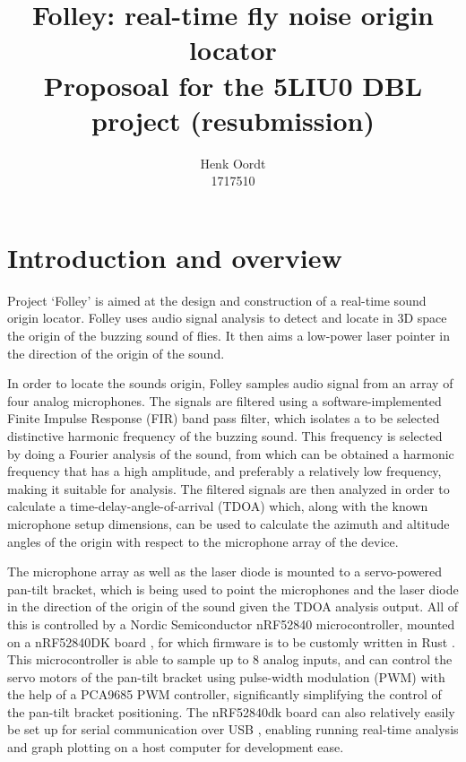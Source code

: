 \documentclass[a4paper]{article}
\begin{document}
\title{{Folley: real-time fly noise origin locator} \\\large {Proposoal for the 5LIU0 DBL project (resubmission)}}
\author{{Henk Oordt} \hfill
\\
{1717510} \hfill}

\maketitle

\section{Introduction and overview}
Project `Folley' is aimed at the design and construction of a real-time sound origin locator. Folley uses audio signal analysis to detect and locate in 3D space the origin of the buzzing sound of flies. It then aims a low-power laser pointer in the direction of the origin of the sound.

In order to locate the sounds origin, Folley samples audio signal from an array of four analog microphones. The signals are filtered using a software-implemented Finite Impulse Response (FIR) band pass filter, which isolates a to be selected distinctive harmonic frequency of the buzzing sound. This frequency is selected by doing a Fourier analysis \cite{fourier_analysis} of the sound, from which can be obtained a harmonic frequency that has a high amplitude, and preferably a relatively low frequency, making it suitable for analysis. The filtered signals are then analyzed in order to calculate a time-delay-angle-of-arrival (TDOA) \cite{6327613} which, along with the known microphone setup dimensions, can be used to calculate the azimuth and altitude angles of the origin with respect to the microphone array of the device.

The microphone array as well as the laser diode is mounted to a servo-powered pan-tilt bracket, which is being used to point the microphones and the laser diode in the direction of the origin of the sound given the TDOA analysis output. All of this is controlled by a Nordic Semiconductor nRF52840 microcontroller, mounted on a nRF52840DK board \cite{nrf52840-dk}, for which firmware is to be customly written in Rust \cite{rust}. This microcontroller is able to sample up to 8 analog inputs, and can control the servo motors of the pan-tilt bracket using pulse-width modulation (PWM) \cite{GULYAEV20161529} with the help of a PCA9685 \cite{pca9685} PWM controller, significantly simplifying the control of the pan-tilt bracket positioning. The nRF52840dk board can also relatively easily be set up for serial communication over USB \cite{usb}, enabling running real-time analysis and graph plotting on a host computer for development ease.
\end{document}
